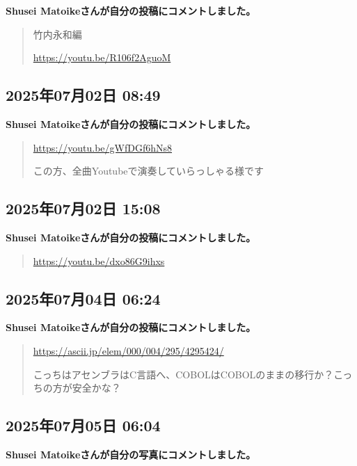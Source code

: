 \textbf{Shusei Matoikeさんが自分の投稿にコメントしました。}

\begin{quote}
竹内永和編

\url{https://youtu.be/R106f2AguoM}
\end{quote}

\subsection*{2025年07月02日 08:49}

\textbf{Shusei Matoikeさんが自分の投稿にコメントしました。}

\begin{quote}
\url{https://youtu.be/gWfDGf6hNs8}

この方、全曲Youtubeで演奏していらっしゃる様です
\end{quote}

\subsection*{2025年07月02日 15:08}

\textbf{Shusei Matoikeさんが自分の投稿にコメントしました。}

\begin{quote}
\url{https://youtu.be/dxo86G9ihxs}
\end{quote}

\subsection*{2025年07月04日 06:24}

\textbf{Shusei Matoikeさんが自分の投稿にコメントしました。}

\begin{quote}
\url{https://ascii.jp/elem/000/004/295/4295424/}

こっちはアセンブラはC言語へ、COBOLはCOBOLのままの移行か？こっちの方が安全かな？
\end{quote}

\subsection*{2025年07月05日 06:04}

\textbf{Shusei Matoikeさんが自分の写真にコメントしました。}

